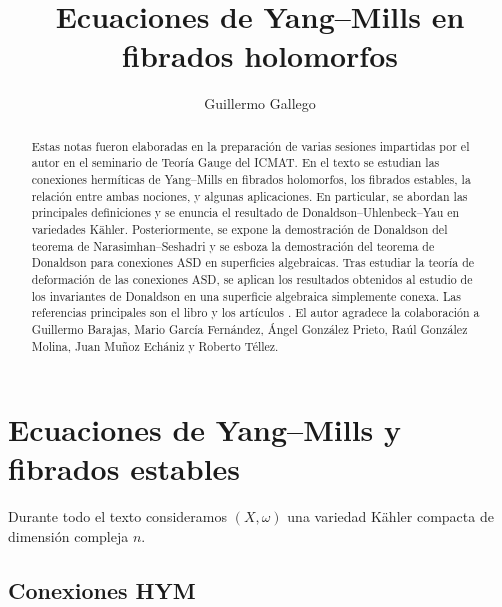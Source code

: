 \documentclass[12pt, a4paper]{amsart}
\author{Guillermo Gallego}
\title{Ecuaciones de Yang--Mills en fibrados holomorfos}
\theoremstyle{remark} \newtheorem{rmk}[thm]{Observación}
\theoremstyle{remark} \newtheorem{rmks}[thm]{Observaciones}
\theoremstyle{definition} \newtheorem{defn}[thm]{Definición}
\theoremstyle{definition} \newtheorem{ejs}[thm]{Ejemplos}
\theoremstyle{definition} \newtheorem{ej}[thm]{Ejemplo}
\begin{document}
	\maketitle
	\begin{abstract}
		Estas notas fueron elaboradas en la preparación de varias sesiones impartidas por el autor en el seminario de Teoría Gauge del ICMAT. En el texto se estudian las conexiones hermíticas de Yang--Mills en fibrados holomorfos, los fibrados estables, la relación entre ambas nociones, y algunas aplicaciones. En particular, se abordan las principales definiciones y se enuncia el resultado de Donaldson--Uhlenbeck--Yau en variedades Kähler. Posteriormente, se expone la demostración de Donaldson del teorema de Narasimhan--Seshadri y se esboza la demostración del teorema de Donaldson para conexiones ASD en superficies algebraicas. Tras estudiar la teoría de deformación de las conexiones ASD, se aplican los resultados obtenidos al estudio de los invariantes de Donaldson en una superficie algebraica simplemente conexa. Las referencias principales son el libro \cite{DK} y los artículos \cite{DNS,DASD,DID,Margerin}. El autor agradece la colaboración a Guillermo Barajas, Mario García Fernández, Ángel González Prieto, Raúl González Molina, Juan Muñoz Echániz y Roberto Téllez.
	\end{abstract}

	\tableofcontents

	\section{Ecuaciones de Yang--Mills y fibrados estables}
	Durante todo el texto consideramos $(X,\omega)$ una variedad Kähler compacta de dimensión compleja $n$.

	\subsection{Conexiones HYM}
\end{document}
